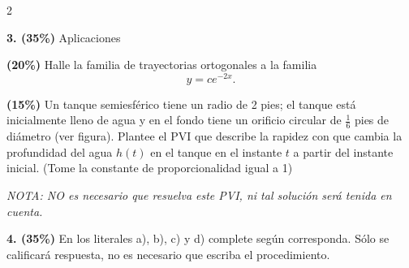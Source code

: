 \documentclass[11pt]{article}
\begin{document}
\begin{multicols}{2}

\textbf{3. (35\%)} Aplicaciones

\begin{opciones}
\item[(a)] \textbf{(20\%)} Halle la familia de trayectorias ortogonales a la familia
\[
y=ce^{-2x}.
\]

\vspace{4cm}

\item[(b)] \textbf{(15\%)} Un tanque semiesférico tiene un radio de 2 pies; el tanque está inicialmente lleno de agua y en el fondo tiene un orificio circular de $\frac{1}{6}$ pies de diámetro (ver figura). Plantee el PVI que describe la rapidez con que cambia la profundidad del agua $h(t)$ en el tanque en el instante $t$ a partir del instante inicial. (Tome la constante de proporcionalidad igual a 1)

\textit{NOTA: NO es necesario que resuelva este PVI, ni tal solución será tenida en cuenta.}
\end{opciones}

\columnbreak

\begin{center}
\end{center}

\vspace{3cm}

\end{multicols}

\noindent\textbf{4. (35\%)} En los literales a), b), c) y d) complete según corresponda. Sólo se calificará respuesta, no es necesario que escriba el procedimiento.
\end{document}
